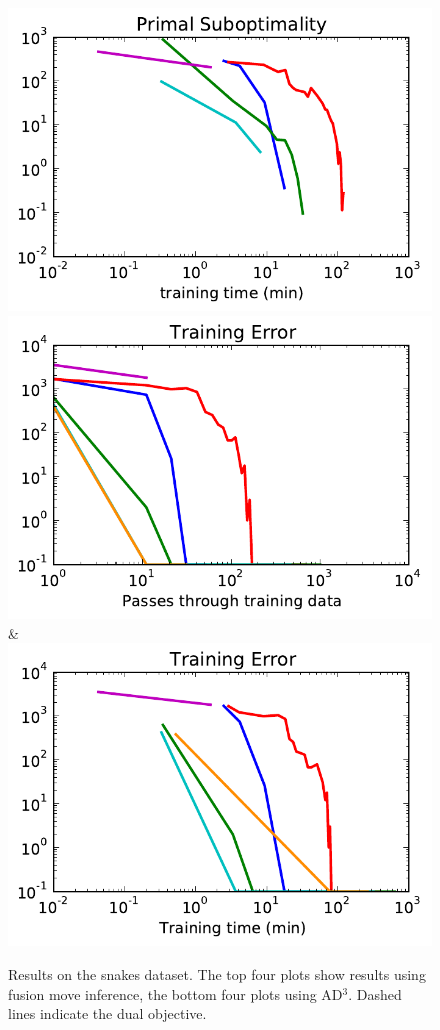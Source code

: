 \begin{figure}
\begin{tabu}
    \includegraphics[width=\linewidth]{evaluation/images/snakes_ad3_time}\\
    \includegraphics[width=\linewidth]{evaluation/images/snakes_ad3_loss}&%
    \includegraphics[width=\linewidth]{evaluation/images/snakes_ad3_time_loss}
    \end{tabu}
\caption{%
    Results on the snakes dataset. The top four plots show results using fusion
    move inference, the bottom four plots using AD$^3$. Dashed lines indicate the dual objective.
}
\end{figure}


